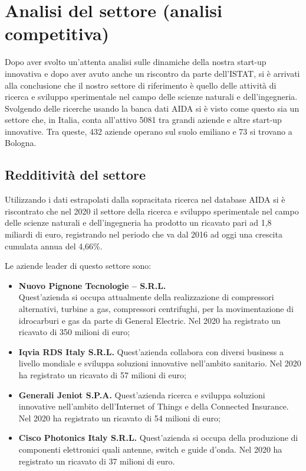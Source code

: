 \section{Analisi del settore (analisi competitiva)}

Dopo aver svolto un’attenta analisi sulle dinamiche della nostra start-up innovativa e dopo aver avuto anche un riscontro da parte dell’ISTAT, si è arrivati alla conclusione che il nostro settore di riferimento è quello delle attività di ricerca e sviluppo sperimentale nel campo delle scienze naturali e dell’ingegneria. Svolgendo delle ricerche usando la banca dati AIDA si è visto come questo sia un settore che, in Italia, conta all’attivo 5081 tra grandi aziende e altre start-up innovative. Tra queste, 432 aziende operano sul suolo emiliano e 73 si trovano a Bologna.

\subsection{Redditività del settore}

Utilizzando i dati estrapolati dalla sopracitata ricerca nel database AIDA si è riscontrato che nel 2020 il settore della ricerca e sviluppo sperimentale nel campo delle scienze naturali e dell’ingegneria ha prodotto un ricavato pari ad 1,8 miliardi di euro, registrando nel periodo che va dal 2016 ad oggi una crescita cumulata annua del 4,66\%.

Le aziende leader di questo settore sono:
\begin{itemize}
	\item \textbf{Nuovo Pignone Tecnologie – S.R.L.}\\
	Quest’azienda si occupa attualmente della realizzazione di compressori alternativi, turbine a gas, compressori centrifughi, per la movimentazione di idrocarburi e gas da parte di General Electric.
	Nel 2020 ha registrato un ricavato di 350 milioni di euro;
	
	\item \textbf{Iqvia RDS Italy S.R.L.}
	Quest’azienda collabora con diversi business a livello mondiale e sviluppa soluzioni innovative nell’ambito sanitario.
	Nel 2020 ha registrato un ricavato di 57 milioni di euro;
	
	\item \textbf{Generali Jeniot S.P.A.}
	Quest’azienda ricerca e sviluppa soluzioni innovative nell’ambito dell’Internet of Things e della Connected Insurance.
	Nel 2020 ha registrato un ricavato di 54 milioni di euro;
	
	\item \textbf{Cisco Photonics Italy S.R.L.}
	Quest’azienda si occupa della produzione di componenti elettronici quali antenne, switch e guide d’onda.
	Nel 2020 ha registrato un ricavato di 37 milioni di euro.	
\end{itemize}

